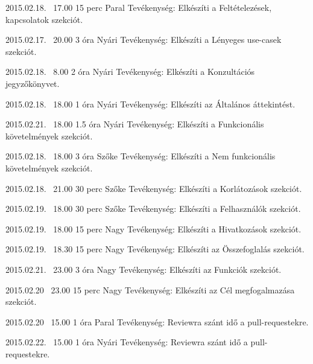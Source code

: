 \begin{naplo}
\bejegyzes
{2015.02.18. ~17.00}
{15 perc}
{Paral} 
{Tevékenység: Elkészíti a Feltételezések, kapcsolatok szekciót.\newline } 

\bejegyzes
{2015.02.17. ~20.00}
{3 óra}
{Nyári} 
{Tevékenység: Elkészíti a Lényeges use-casek szekciót.\newline } 

\bejegyzes
{2015.02.18. ~8.00}
{2 óra}
{Nyári} 
{Tevékenység: Elkészíti a Konzultációs jegyzőkönyvet.\newline } 

\bejegyzes
{2015.02.18. ~18.00}
{1 óra}
{Nyári} 
{Tevékenység: Elkészíti az Általános áttekintést.\newline } 

\bejegyzes
{2015.02.21. ~18.00}
{1.5 óra}
{Nyári} 
{Tevékenység: Elkészíti a Funkcionális követelmények szekciót.\newline } 

\bejegyzes
{2015.02.18. ~18.00}
{3 óra}
{Szőke} 
{Tevékenység: Elkészíti a Nem funkcionális követelmények szekciót.\newline } 

\bejegyzes
{2015.02.18. ~21.00}
{30 perc}
{Szőke} 
{Tevékenység: Elkészíti a Korlátozások szekciót.\newline } 

\bejegyzes
{2015.02.19. ~18.00}
{30 perc}
{Szőke} 
{Tevékenység: Elkészíti a Felhasználók szekciót.\newline } 

\bejegyzes
{2015.02.19. ~18.00}
{15 perc}
{Nagy} 
{Tevékenység: Elkészíti a Hivatkozások szekciót.\newline } 

\bejegyzes
{2015.02.19. ~18.30}
{15 perc}
{Nagy} 
{Tevékenység: Elkészíti az Összefoglalás szekciót.\newline } 

\bejegyzes
{2015.02.21. ~23.00}
{3 óra}
{Nagy} 
{Tevékenység: Elkészíti az Funkciók szekciót.\newline } 

\bejegyzes
{2015.02.20 ~23.00}
{15 perc}
{Nagy} 
{Tevékenység: Elkészíti az Cél megfogalmazása szekciót.\newline } 

\bejegyzes
{2015.02.20 ~15.00}
{1 óra}
{Paral} 
{Tevékenység: Reviewra szánt idő a pull-requestekre.\newline } 

\bejegyzes
{2015.02.22. ~15.00}
{1 óra}
{Nyári} 
{Tevékenység: Reviewra szánt idő a pull-requestekre.\newline } 


\end{naplo}
